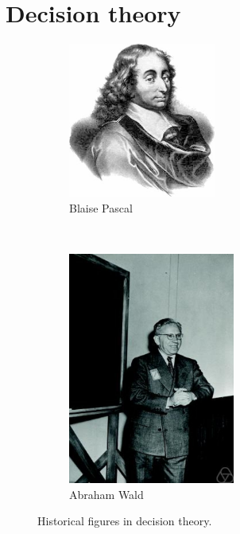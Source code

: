 \documentclass[12pt]{article}
\begin{document}
\vspace{10ex}

\section{Decision theory}

\begin{figure}
    \centering
    \begin{subfigure}[t]{0.5\textwidth}
        \centering
        \includegraphics[height=2in]{Pascal.jpg}
        \caption*{Blaise Pascal}
    \end{subfigure}%
    ~ 
    \begin{subfigure}[t]{0.5\textwidth}
        \centering
        \includegraphics[height=3in]{Wald.jpg}
        \caption*{Abraham Wald}
    \end{subfigure}
    \caption{Historical figures in decision theory.}
\end{figure}
\end{document}
